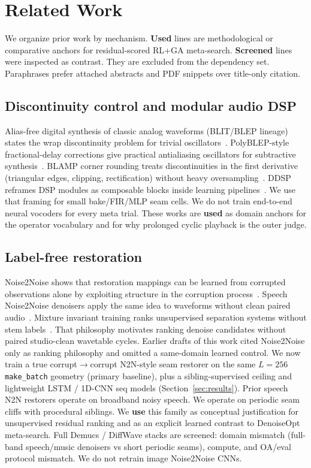\section{Related Work}
\label{sec:related_work}

We organize prior work by mechanism.
\textbf{Used} lines are methodological or comparative anchors for residual-scored RL+GA meta-search.
\textbf{Screened} lines were inspected as contrast. They are excluded from the dependency set.
Paraphrases prefer attached abstracts and PDF snippets over title-only citation.

\subsection{Discontinuity control and modular audio DSP}
Alias-free digital synthesis of classic analog waveforms (BLIT/BLEP lineage) states the wrap discontinuity problem for trivial oscillators~\cite{stilson1996}.
PolyBLEP-style fractional-delay corrections give practical antialiasing oscillators for subtractive synthesis~\cite{nam2009polyblep}.
BLAMP corner rounding treats discontinuities in the first derivative (triangular edges, clipping, rectification) without heavy oversampling~\cite{esqueda2016blamp}.
DDSP reframes DSP modules as composable blocks inside learning pipelines~\cite{engel2020}.
We use that framing for small bake/FIR/MLP seam cells.
We do not train end-to-end neural vocoders for every meta trial.
These works are \textbf{used} as domain anchors for the operator vocabulary and for why prolonged cyclic playback is the outer judge.

\subsection{Label-free restoration}
Noise2Noise shows that restoration mappings can be learned from corrupted observations alone by exploiting structure in the corruption process~\cite{lehtinen2018}.
Speech Noise2Noise denoisers apply the same idea to waveforms without clean paired audio~\cite{kashyap2021n2n}.
Mixture invariant training ranks unsupervised separation systems without stem labels~\cite{wisdom2020}.
That philosophy motivates ranking denoise candidates without paired studio-clean wavetable cycles.
Earlier drafts of this work cited Noise2Noise only as ranking philosophy and omitted a same-domain learned control.
We now train a true corrupt$\to$corrupt N2N-style seam restorer on the same $L{=}256$ \texttt{make\_batch} geometry (primary baseline), plus a sibling-supervised ceiling and lightweight LSTM / 1D-CNN seq models (Section~\ref{sec:results}).
Prior speech N2N restorers operate on broadband noisy speech.
We operate on periodic seam cliffs with procedural siblings.
We \textbf{use} this family as conceptual justification for unsupervised residual ranking and as an explicit learned contrast to DenoiseOpt meta-search.
Full Demucs / DiffWave stacks are screened: domain mismatch (full-band speech/music denoisers vs short periodic seams), compute, and OA/eval protocol mismatch.
We do not retrain image Noise2Noise CNNs.

